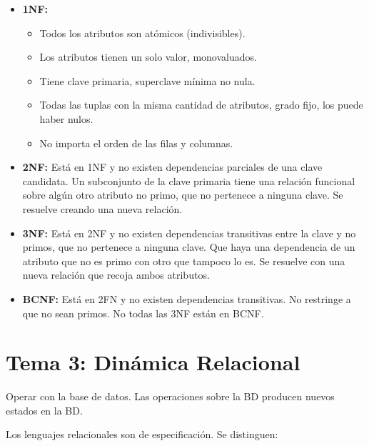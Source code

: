 \documentclass[12pt, twoside, openright]{report} %
\begin{document}
  \begin{itemize}
  \item \textbf{1NF:}
    

    \begin{itemize}
    \item Todos los atributos son atómicos (indivisibles).
      
    \item Los atributos tienen un solo valor, monovaluados.
      
    \item Tiene clave primaria, superclave mínima no nula.
      
    \item Todas las tuplas con la misma cantidad de atributos, grado fijo,
      los puede haber nulos.
      
    \item No importa el orden de las filas y columnas.
      
    \end{itemize}
  \item \textbf{2NF:} Está en 1NF y no existen dependencias parciales de una
    clave candidata. Un subconjunto de la clave primaria tiene una
    relación funcional sobre algún otro atributo no primo, que no
    pertenece a ninguna clave. Se resuelve creando una nueva relación.
    
  \item \textbf{3NF:} Está en 2NF y no existen dependencias transitivas
    entre la clave y no primos, que no pertenece a ninguna clave. Que
    haya una dependencia de un atributo que no es primo con otro que
    tampoco lo es. Se resuelve con una nueva relación que recoja ambos
    atributos.
    
  \item \textbf{BCNF:} Está en 2FN y no existen dependencias transitivas. No
    restringe a que no sean primos. No todas las 3NF están en BCNF.
    
  \end{itemize}


\chapter{Tema 3: Dinámica Relacional}



  
  Operar con la base de datos. Las operaciones sobre la BD producen
  nuevos estados en la BD.
  

  
  Los lenguajes relacionales son de especificación. Se distinguen:
  
\end{document}
